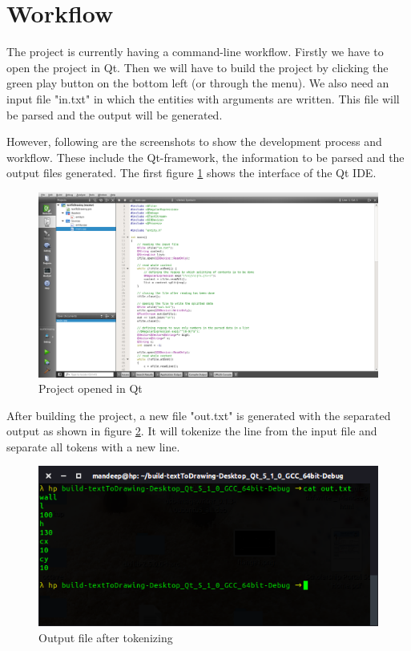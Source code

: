 \section{Workflow}
The project is currently having a command-line workflow.  Firstly we have to open the project in Qt. Then we will have to build the project by clicking the green play button on the bottom left (or through the menu). We also need an input file "in.txt" in which the entities with arguments are written. This file will be parsed and the output will be generated.

However, following are the screenshots to show the development process and workflow. These include the Qt-framework, the information to be parsed and the output files generated. The first figure \ref{fig:qt} shows the interface of the Qt IDE.

\begin{figure}
\centering
\includegraphics[scale=0.32]{images/qt-1.png}
\caption{Project opened in Qt}
\label{fig:qt}
\end{figure}

After building the project, a new file "out.txt" is generated with the separated output as shown in figure \ref{fig:cli}. It will tokenize the line from the input file and separate all tokens with a new line.

\begin{figure}
\centering
\includegraphics[scale=0.8]{images/p2.png}
\caption{Output file after tokenizing}
\label{fig:cli}
\end{figure}

